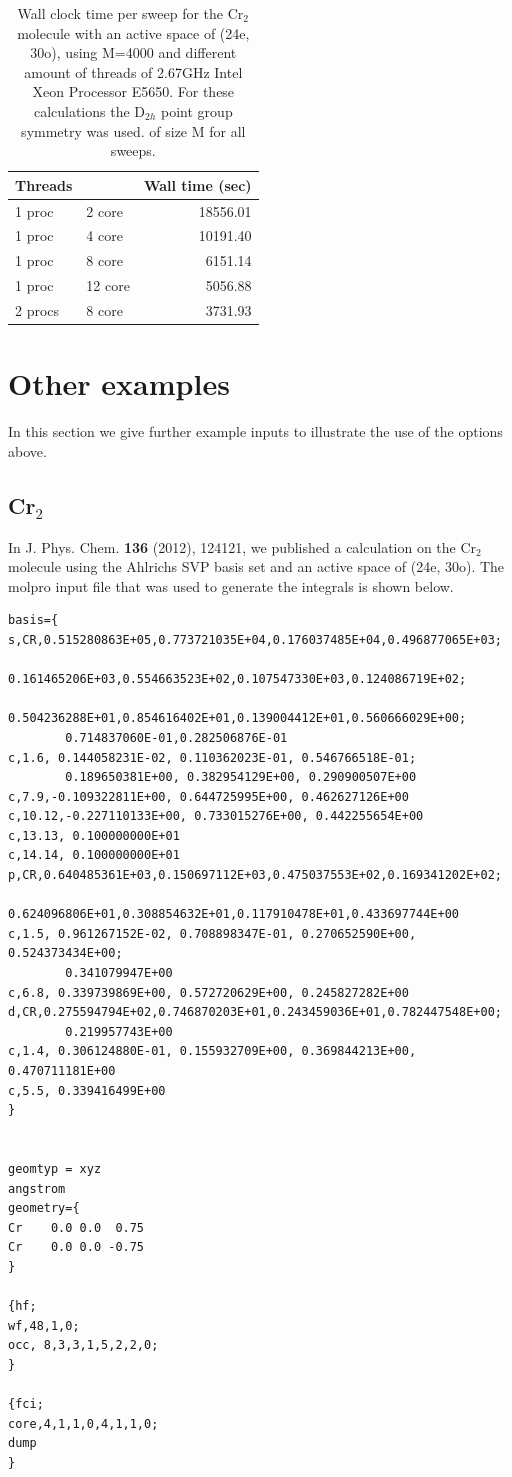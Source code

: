 \documentclass[letterpaper,12pt,aps, pra]{revtex4-1}
\begin{document}
\begin{table}
\begin{center}
\begin{tabular}{llr}
\hline
\hline
Threads && Wall time (sec)\\
\hline
1 proc &2 core  &18556.01\\
1 proc &4 core  &10191.40\\
1 proc &8 core  &6151.14\\
1 proc &12 core &5056.88\\
2 procs &8 core &3731.93\\
\hline
\hline
\end{tabular}
\end{center}
\caption{Wall clock time per sweep for the Cr$_2$ molecule with an
active space of (24e, 30o), using M=4000 and different amount of
threads of 2.67GHz Intel Xeon Processor E5650. For these calculations
the D$_{2h}$ point group symmetry was used.  of size M for all sweeps.
} \label{tab:thread}
\end{table}

\section{Other examples}
In this section we give further example inputs to illustrate
the use of the options above.

\subsection{Cr$_2$}\label{sec:cr2}
In J. Phys. Chem. \textbf{136} (2012), 124121, we published a calculation on the Cr$_2$ molecule using the Ahlrichs SVP basis set and an active space of (24e, 30o). The molpro input file that was used to generate the integrals is shown below. 
\begin{verbatim}
basis={
s,CR,0.515280863E+05,0.773721035E+04,0.176037485E+04,0.496877065E+03;
        0.161465206E+03,0.554663523E+02,0.107547330E+03,0.124086719E+02;
        0.504236288E+01,0.854616402E+01,0.139004412E+01,0.560666029E+00;
        0.714837060E-01,0.282506876E-01
c,1.6, 0.144058231E-02, 0.110362023E-01, 0.546766518E-01;
        0.189650381E+00, 0.382954129E+00, 0.290900507E+00
c,7.9,-0.109322811E+00, 0.644725995E+00, 0.462627126E+00
c,10.12,-0.227110133E+00, 0.733015276E+00, 0.442255654E+00
c,13.13, 0.100000000E+01
c,14.14, 0.100000000E+01
p,CR,0.640485361E+03,0.150697112E+03,0.475037553E+02,0.169341202E+02;
        0.624096806E+01,0.308854632E+01,0.117910478E+01,0.433697744E+00
c,1.5, 0.961267152E-02, 0.708898347E-01, 0.270652590E+00, 0.524373434E+00;
        0.341079947E+00
c,6.8, 0.339739869E+00, 0.572720629E+00, 0.245827282E+00
d,CR,0.275594794E+02,0.746870203E+01,0.243459036E+01,0.782447548E+00;
        0.219957743E+00
c,1.4, 0.306124880E-01, 0.155932709E+00, 0.369844213E+00, 0.470711181E+00
c,5.5, 0.339416499E+00
}


geomtyp = xyz
angstrom
geometry={
Cr    0.0 0.0  0.75
Cr    0.0 0.0 -0.75
}

{hf; 
wf,48,1,0; 
occ, 8,3,3,1,5,2,2,0;
}

{fci;
core,4,1,1,0,4,1,1,0;
dump
}
\end{verbatim}
\end{document}
